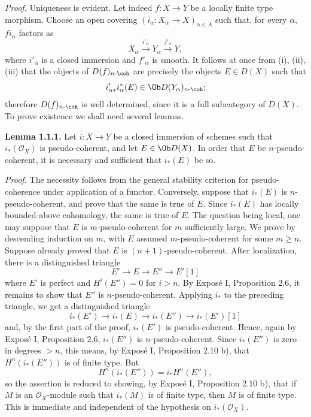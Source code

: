 \documentclass[11pt]{article}
\begin{document}
\emph{Proof.} Uniqueness is evident. Let indeed \(f:X\to Y\) be a locally finite type morphism. Choose an open covering \((i_\alpha:X_\alpha\to X)_{\alpha\in A}\) such that, for every \(\alpha\), \(fi_\alpha\) factors as
\[
  X_\alpha \xrightarrow{i'_\alpha} Y_\alpha \xrightarrow{f'_\alpha} Y,
\]
where \(i'_\alpha\) is a closed immersion and \(f'_\alpha\) is smooth. It follows at once from (i), (ii), (iii) that the objects of \(D(f)_{n\text{-}\coh}\) are precisely the objects \(E\in D(X)\) such that
\[
  i'_{\alpha *}i_\alpha^*(E)\in \Ob D(Y_\alpha)_{n\text{-}\coh};
\]
therefore \(D(f)_{n\text{-}\coh}\) is well determined, since it is a full subcategory of \(D(X)\). To prove existence we shall need several lemmas.

\textbf{Lemma 1.1.1.} Let \(i:X\to Y\) be a closed immersion of schemes such that \(i_*(\mathcal O_X)\) is pseudo-coherent, and let \(E\in \Ob D(X)\). In order that \(E\) be \(n\)-pseudo-coherent, it is necessary and sufficient that \(i_*(E)\) be so.

\emph{Proof.} The necessity follows from the general stability criterion for pseudo-coherence under application of a functor. Conversely, suppose that \(i_*(E)\) is \(n\)-pseudo-coherent, and prove that the same is true of \(E\). Since \(i_*(E)\) has locally bounded-above cohomology, the same is true of \(E\). The question being local, one may suppose that \(E\) is \(m\)-pseudo-coherent for \(m\) sufficiently large. We prove by descending induction on \(m\), with \(E\) assumed \(m\)-pseudo-coherent for some \(m\geq n\). Suppose already proved that \(E\) is \((n+1)\)-pseudo-coherent. After localization, there is a distinguished triangle
\[
E'\longrightarrow E\longrightarrow E''\longrightarrow E'[1]
\]
where \(E'\) is perfect and \(H^i(E'')=0\) for \(i>n\). By Exposé I, Proposition 2.6, it remains to show that \(E''\) is \(n\)-pseudo-coherent. Applying \(i_*\) to the preceding triangle, we get a distinguished triangle
\[
i_*(E')\longrightarrow i_*(E)\longrightarrow i_*(E'')\longrightarrow i_*(E')[1]
\]
and, by the first part of the proof, \(i_*(E')\) is pseudo-coherent. Hence, again by Exposé I, Proposition 2.6, \(i_*(E'')\) is \(n\)-pseudo-coherent. Since \(i_*(E'')\) is zero in degrees \(>n\), this means, by Exposé I, Proposition 2.10 b), that \(H^n(i_*(E''))\) is of finite type. But
\[
  H^n(i_*(E''))=i_*H^n(E''),
\]
so the assertion is reduced to showing, by Exposé I, Proposition 2.10 b), that if \(M\) is an \(\mathcal O_X\)-module such that \(i_*(M)\) is of finite type, then \(M\) is of finite type. This is immediate and independent of the hypothesis on \(i_*(\mathcal O_X)\).
\end{document}
